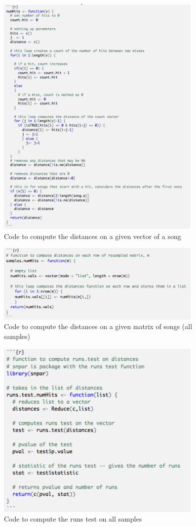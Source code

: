 \documentclass[12pt, letterpaper]{article}
\begin{document}
\begin{figure}[!hb]
\centering
\includegraphics[width=10cm]{DistancesCode.png}
\caption{Code to compute the distances on a given vector of a song}
\label{fig: Distances Code}
\end{figure}

\begin{figure}[!hb]
\centering
\includegraphics[width=10cm]{DistanceCodeforSamples.png}
\caption{Code to compute the distances on a given matrix of songs (all samples)}
\label{fig: Distances Code for Samples}
\end{figure}

\begin{figure}[!hb]
\centering
\includegraphics[width=10cm]{RunsTestforSamples.png}
\caption{Code to compute the runs test on all samples}
\label{fig: Runs Test Code for Samples}
\end{figure}
\end{document}
